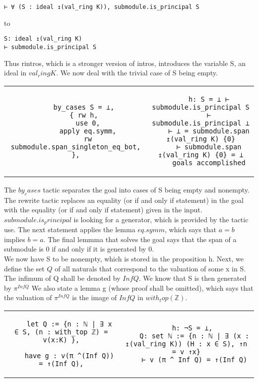 \documentclass[10pt, a4paper]{article}
\begin{document}
\begin{lstlisting}
⊢ ∀ (S : ideal ↥(val_ring K)), submodule.is_principal S
\end{lstlisting}
to
\begin{lstlisting}
S: ideal ↥(val_ring K)
⊢ submodule.is_principal S
\end{lstlisting}

Thus rintros, which is a stronger version of intros, introduces the variable S, an ideal in $val_ring K$. We now deal with the trivial case of S being empty. \\

\begin{tabular}{c|c}
    \begin{lstlisting}
    by_cases S = ⊥,
    { rw h,
      use 0,
      apply eq.symm,
      rw submodule.span_singleton_eq_bot, },
    \end{lstlisting}     &  
    \begin{lstlisting}
    h: S = ⊥ ⊢ submodule.is_principal S
    ⊢ submodule.is_principal ⊥
    ⊢ ⊥ = submodule.span ↥(val_ring K) {0}
    ⊢ submodule.span ↥(val_ring K) {0} = ⊥
    goals accomplished
    \end{lstlisting}
\end{tabular}
\label{tab:my_label}

The $by_cases$ tactic separates the goal into cases of S being empty and nonempty. The rewrite tactic replaces an equality (or if and only if statement) in the goal with the equality (or if and only if statement) given in the input. $submodule.is_principal$ is looking for a generator, which is provided by the tactic use. The next statement applies the lemma $eq.symm$, which says that $a = b$ implies $b=a$. The final lemmma that solves the goal says that the span of a submodule is 0 if and only if it is generated by 0. \\

We now have S to be nonempty, which is stored in the proposition h. Next, we define the set $Q$ of all naturals that correspond to the valuation of some x in S. The infimum of Q shall be denoted by $Inf Q$. We know that S is then generated by $\pi^{Inf Q}$ We also state a lemma g (whose proof shall be omitted), which says that the valuation of $\pi^{Inf Q}$ is the image of $Inf Q$ in $with_top(\mathbb{Z})$. \\

\begin{tabular}{c|c}
    \begin{lstlisting}
    let Q := {n : ℕ | ∃ x ∈ S, (n : with_top ℤ) = v(x:K) },
    
    have g : v(π ^(Inf Q)) = ↑(Inf Q),
    \end{lstlisting} &  
    \begin{lstlisting}
    h: ¬S = ⊥, 
    Q: set ℕ := {n : ℕ | ∃ (x : ↥(val_ring K)) (H : x ∈ S), ↑n = v ↑x}
    ⊢ v (π ^ Inf Q) = ↑(Inf Q)
    \end{lstlisting}
\end{tabular}
\end{document}
